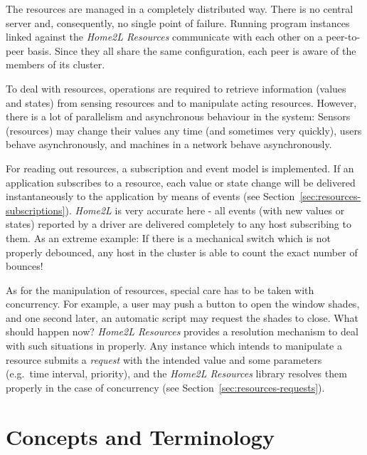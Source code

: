 \documentclass[12pt,english,parskip=half]{scrreprt}
\begin{document}
The resources are managed in a completely distributed way. There is no
central server and, consequently, no single point of failure. Running
program instances linked against the \emph{Home2L Resources} communicate
with each other on a peer-to-peer basis. Since they all share the same
configuration, each peer is aware of the members of its cluster.

To deal with resources, operations are required to retrieve information
(values and states) from sensing resources and to manipulate acting
resources. However, there is a lot of parallelism and asynchronous
behaviour in the system: Sensors (resources) may change their values any
time (and sometimes very quickly), users behave asynchronously, and
machines in a network behave asynchronously.

For reading out resources, a subscription and event model is implemented.
If an application subscribes to a resource, each value or state
change will be delivered instantaneously to the application by means of
events (see Section~\ref{sec:resources-subscriptions}).
\emph{Home2L} is very accurate here - all events (with new
values or states) reported by a driver are delivered completely to any
host subscribing to them. As an extreme example: If there is a
mechanical switch which is not properly debounced, any host in the
cluster is able to count the exact number of bounces!

As for the manipulation of resources, special care has to be taken with
concurrency. For example, a user may push a button to open the window
shades, and one second later, an automatic script may request the
shades to close. What should happen now?
\emph{Home2L Resources} provides
a resolution mechanism to deal with such situations in properly. Any
instance which intends to manipulate a resource submits a \emph{request}
with the intended value and some parameters (e.g.~time interval,
priority), and the \emph{Home2L Resources} library resolves them
properly in the case of concurrency (see Section~\ref{sec:resources-requests}).





\section{Concepts and Terminology}
\label{sec:resources-terminology}
\end{document}
